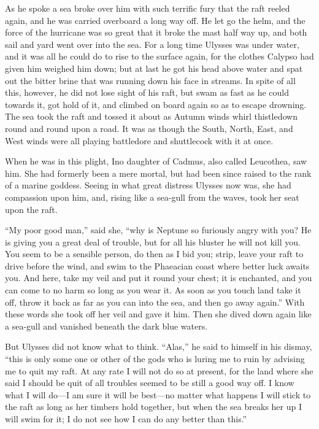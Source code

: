 As he spoke a sea broke over him with such terrific fury that the raft reeled
again, and he was carried overboard a long way off. He let go the helm, and the
force of the hurricane was so great that it broke the mast half way up, and
both sail and yard went over into the sea. For a long time Ulysses was under
water, and it was all he could do to rise to the surface again, for the clothes
Calypso had given him weighed him down; but at last he got his head above water
and spat out the bitter brine that was running down his face in streams. In
spite of all this, however, he did not lose sight of his raft, but swam as fast
as he could towards it, got hold of it, and climbed on board again so as to
escape drowning. The sea took the raft and tossed it about as Autumn winds
whirl thistledown round and round upon a road. It was as though the South,
North, East, and West winds were all playing battledore and shuttlecock with it
at once.

When he was in this plight, Ino daughter of Cadmus, also called Leucothea, saw
him. She had formerly been a mere mortal, but had been since raised to the rank
of a marine goddess. Seeing in what great distress Ulysses now was, she had
compassion upon him, and, rising like a sea-gull from the waves, took her seat
upon the raft.

“My poor good man,” said she, “why is Neptune so furiously angry with you? He
is giving you a great deal of trouble, but for all his bluster he will not kill
you. You seem to be a sensible person, do then as I bid you; strip, leave your
raft to drive before the wind, and swim to the Phaeacian coast where better
luck awaits you. And here, take my veil and put it round your chest; it is
enchanted, and you can come to no harm so long as you wear it. As soon as you
touch land take it off, throw it back as far as you can into the sea, and then
go away again.” With these words she took off her veil and gave it him. Then
she dived down again like a sea-gull and vanished beneath the dark blue waters.

But Ulysses did not know what to think. “Alas,” he said to himself in his
dismay, “this is only some one or other of the gods who is luring me to ruin by
advising me to quit my raft. At any rate I will not do so at present, for the
land where she said I should be quit of all troubles seemed to be still a good
way off. I know what I will do—I am sure it will be best—no matter what happens
I will stick to the raft as long as her timbers hold together, but when the sea
breaks her up I will swim for it; I do not see how I can do any better than
this.”

